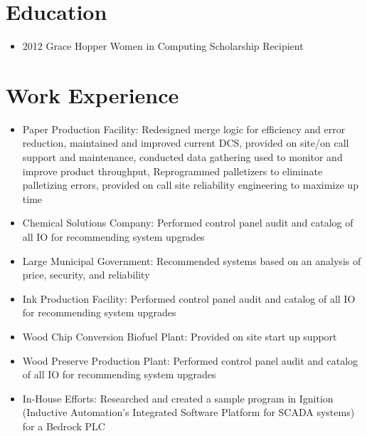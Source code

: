 \documentclass[11pt,letterpaper,sans]{moderncv}        %
\begin{document}
\makecvtitle

\vspace{-15mm}

\section{Education}
\vspace{-1mm}
\begin{itemize}
\item 2012 Grace Hopper Women in Computing Scholarship Recipient
\end{itemize}
\vspace{1mm}

\section{Work Experience}

\begin{itemize}
\item Paper Production Facility: Redesigned merge logic for efficiency and error reduction, maintained and improved current DCS, provided on site/on call support and maintenance, conducted data gathering used to monitor and improve product throughput, Reprogrammed palletizers to eliminate palletizing errors, provided on call site reliability engineering to maximize up time
\item Chemical Solutions Company: Performed control panel audit and catalog of all IO for recommending system upgrades
\item Large Municipal Government: Recommended systems based on an analysis of price, security, and reliability
\item Ink Production Facility: Performed control panel audit and catalog of all IO for recommending system upgrades
\item Wood Chip Conversion Biofuel Plant: Provided on site start up support
\item Wood Preserve Production Plant: Performed control panel audit and catalog of all IO for recommending system upgrades
\item In-House Efforts: Researched and created a sample program in Ignition (Inductive Automation’s Integrated Software Platform for SCADA systems) for a Bedrock PLC
\end{itemize}
\end{document}

